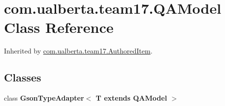 \hypertarget{classcom_1_1ualberta_1_1team17_1_1_q_a_model}{\section{com.\+ualberta.\+team17.\+Q\+A\+Model Class Reference}
\label{classcom_1_1ualberta_1_1team17_1_1_q_a_model}
}


Inherited by \hyperlink{classcom_1_1ualberta_1_1team17_1_1_authored_item}{com.\+ualberta.\+team17.\+Authored\+Item}.

\subsection*{Classes}
\begin{DoxyCompactItemize}
\item 
class {\bfseries Gson\+Type\+Adapter$<$ T extends Q\+A\+Model $>$}
\end{DoxyCompactItemize}
